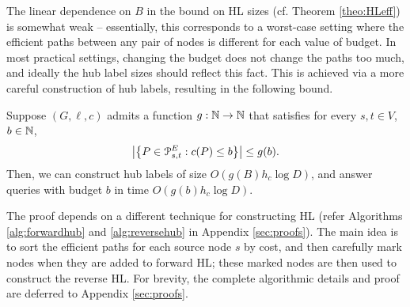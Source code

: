 \label{sec:frontier}

The linear dependence on $B$ in the bound on HL sizes (cf. Theorem \ref{theo:HLeff}) is somewhat weak -- essentially, this corresponds to a worst-case setting where the efficient paths between any pair of nodes is different for each value of budget. In most practical settings, changing the budget does not change the paths too much, and ideally the hub label sizes should reflect this fact. This is achieved via a more careful construction of hub labels, resulting in the following bound. 
\begin{theorem}
\label{thm:markedhubs}
Suppose $(G,\ell,c)$ admits a function $g:\N\to \N$ that satisfies for every $s,t\in V$, $b\in \N$,
\[
\abs*{\crl*{P\in\Pst^E: c(P)\leq b}} \leq g(b).
\]
Then, we can construct hub labels of size $O(g(B)h_c\log D)$, and answer queries with budget $b$ in time $O(g(b)h_c\log D)$.
\end{theorem}

The proof depends on a different technique for constructing HL (refer Algorithms \ref{alg:forwardhub} and \ref{alg:reversehub} in Appendix \ref{sec:proofs}). The main idea is to sort the efficient paths for each source node $s$ by cost, and then carefully mark nodes when they are added to forward HL; these marked nodes are then used to construct the reverse HL.
For brevity, the complete algorithmic details and proof are deferred to Appendix \ref{sec:proofs}.


